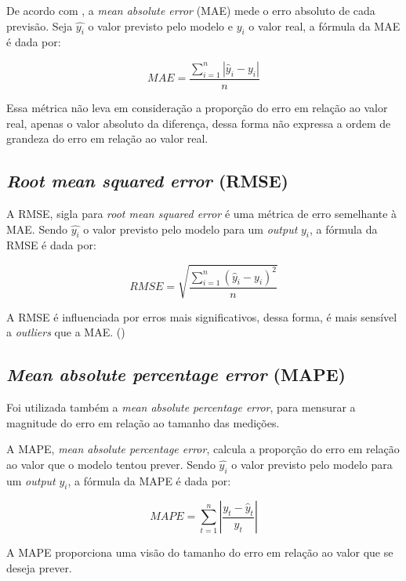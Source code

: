 De acordo com \citet{forecast-evaluation-ds}, a
\textit{mean absolute error} (MAE)
mede o erro absoluto de cada previsão. Seja $\hat{y_i}$ o valor previsto pelo 
modelo e $y_i$ o valor real, a fórmula da MAE é dada por:

\begin{equation}
    MAE = \frac{\sum_{i=1}^n |\hat{y}_i - y_i|}{n}
\end{equation}

Essa métrica não leva em consideração a proporção do erro em relação ao valor
real, apenas o valor absoluto da diferença, dessa forma não expressa a ordem de
grandeza do erro em relação ao valor real.

\subsection{\textit{Root mean squared error} (RMSE)}

A RMSE, sigla para \textit{root mean squared  error} é uma métrica de erro
semelhante à MAE. Sendo $\hat{y_i}$ o valor previsto pelo 
modelo para um \textit{output} $y_i$, a fórmula da RMSE é dada por: 

\begin{equation}
    RMSE = \sqrt{\frac{\sum_{i=1}^n (\hat{y}_i - y_i)^2}{n}}
\end{equation}

A RMSE é influenciada por erros mais significativos, dessa forma, é mais 
sensível a \textit{outliers} que a MAE. (\cite{forecast-evaluation-ds})

\subsection{\textit{Mean absolute percentage error} (MAPE)}

Foi utilizada também a \textit{mean absolute
percentage error}, para mensurar a magnitude do erro em 
relação ao tamanho das medições.

A MAPE, \textit{mean absolute percentage error}, calcula a proporção 
do erro em relação ao valor que o modelo tentou prever. Sendo $\hat{y_i}$ 
o valor previsto pelo 
modelo para um \textit{output} $y_i$, a fórmula da MAPE é dada por: 

\begin{equation}
    MAPE=\sum_{t=1}^n\left|\frac{y_t-\hat{y}_t}{y_t}\right|
\end{equation}

A MAPE proporciona uma visão do tamanho do erro em relação ao valor que se 
deseja prever.

